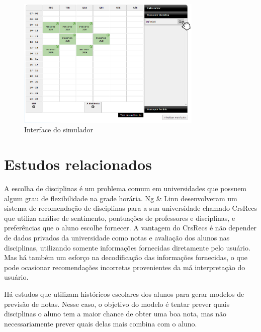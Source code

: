\begin{figure}[!ht]
  \begin{center}
  \includegraphics[width=250pt]{figuras/simulador}
  \caption{Interface do simulador}
  \label{fig:simulador}
  \end{center}
\end{figure}

\section{Estudos relacionados}

A escolha de disciplinas é um problema comum em universidades que possuem algum grau de flexibilidade na grade horária. Ng \& Linn\cite{crs-recs} desenvolveram um sistema de recomendação de disciplinas para a sua universidade chamado CrsRecs que utiliza análise de sentimento, pontuações de professores e disciplinas, e preferências que o aluno escolhe fornecer. A vantagem do CrsRecs é não depender de dados privados da universidade como notas e avaliação dos alunos nas disciplinas, utilizando somente informações fornecidas diretamente pelo usuário. Mas há também um esforço na decodificação das informações fornecidas, o que pode ocasionar recomendações incorretas provenientes da má interpretação do usuário.

Há estudos que utilizam históricos escolares dos alunos para gerar modelos de previsão de notas.\cite{rani-machine-learning,nguyen-learning-outcome,adak-fuzzy} Nesse caso, o objetivo do modelo é tentar prever quais disciplinas o aluno tem a maior chance de obter uma boa nota, mas não necessariamente prever quais delas mais combina com o aluno.\cite{rani-machine-learning,nguyen-learning-outcome}

